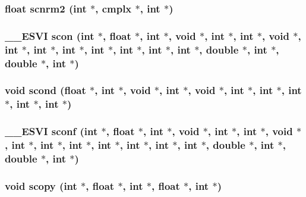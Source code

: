 \subsubsection{\setlength{\rightskip}{0pt plus 5cm}float scnrm2 (int $\ast$, {\bf cmplx} $\ast$, int $\ast$)}\label{essl_8h_bfe0db5484310dcd98c6d4374cc83778}


\subsubsection{\setlength{\rightskip}{0pt plus 5cm}\_\-\_\-ESVI scon (int $\ast$, float $\ast$, int $\ast$, void $\ast$, int $\ast$, int $\ast$, void $\ast$, int $\ast$, int $\ast$, int $\ast$, int $\ast$, int $\ast$, int $\ast$, int $\ast$, double $\ast$, int $\ast$, double $\ast$, int $\ast$)}\label{essl_8h_3f8e02b640e907355f06ba0fd4ff8ee6}


\subsubsection{\setlength{\rightskip}{0pt plus 5cm}void scond (float $\ast$, int $\ast$, void $\ast$, int $\ast$, void $\ast$, int $\ast$, int $\ast$, int $\ast$, int $\ast$, int $\ast$)}\label{essl_8h_6ccb6f44b98c9a5047619959dab4fe47}


\subsubsection{\setlength{\rightskip}{0pt plus 5cm}\_\-\_\-ESVI sconf (int $\ast$, float $\ast$, int $\ast$, void $\ast$, int $\ast$, int $\ast$, void $\ast$, int $\ast$, int $\ast$, int $\ast$, int $\ast$, int $\ast$, int $\ast$, int $\ast$, double $\ast$, int $\ast$, double $\ast$, int $\ast$)}\label{essl_8h_10d788f0ff4caa013c4d6e3579bf9d9b}


\subsubsection{\setlength{\rightskip}{0pt plus 5cm}void scopy (int $\ast$, float $\ast$, int $\ast$, float $\ast$, int $\ast$)}\label{essl_8h_a3df986971b0832ebc9b6293c7a42d67}


